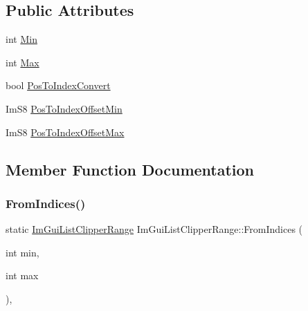 \subsection*{Public Attributes}
\begin{DoxyCompactItemize}
\item 
int \hyperlink{structImGuiListClipperRange_a5d0f961e00fadc1aa57fb72c197e6bf4}{Min}
\item 
int \hyperlink{structImGuiListClipperRange_a4086dae7cf99d5fba97956acc3a2263b}{Max}
\item 
bool \hyperlink{structImGuiListClipperRange_ad78789e655a72bcf19d33a77c09dfe6d}{Pos\+To\+Index\+Convert}
\item 
Im\+S8 \hyperlink{structImGuiListClipperRange_a7ea08ac3ce07bf99b1579ef29d911dba}{Pos\+To\+Index\+Offset\+Min}
\item 
Im\+S8 \hyperlink{structImGuiListClipperRange_a263e4c13cf54c0f5c402af04f3e84a30}{Pos\+To\+Index\+Offset\+Max}
\end{DoxyCompactItemize}


\subsection{Member Function Documentation}
\mbox{\label{structImGuiListClipperRange_ae04d9b8993b4fafcbf416fbaeed316b1}} 
\subsubsection{\texorpdfstring{From\+Indices()}{FromIndices()}}
{\footnotesize\ttfamily static \hyperlink{structImGuiListClipperRange}{Im\+Gui\+List\+Clipper\+Range} Im\+Gui\+List\+Clipper\+Range\+::\+From\+Indices (\begin{DoxyParamCaption}\item[{int}]{min,  }\item[{int}]{max }\end{DoxyParamCaption})\hspace{0.3cm}{\ttfamily [inline]}, {\ttfamily [static]}}

\mbox{\label{structImGuiListClipperRange_a3aa356015543dd8c9096e412390aacf0}} 
